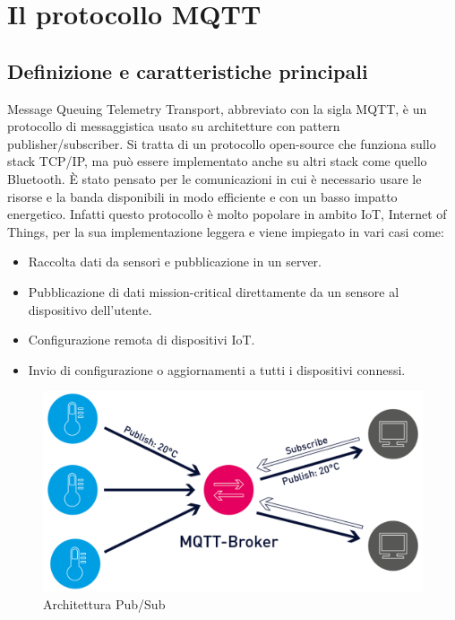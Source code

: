 
\chapter{Il protocollo MQTT}
\label{ch:mqtt}

\section{Definizione e caratteristiche principali}
\label{sec:mqtt-definizione}
Message Queuing Telemetry Transport, abbreviato con la sigla MQTT, è un protocollo di messaggistica usato su
architetture con pattern publisher/subscriber.
Si tratta di un protocollo open-source che funziona sullo stack TCP/IP, ma può essere implementato anche su altri
stack come quello Bluetooth.
È stato pensato per le comunicazioni in cui è necessario usare le risorse e la banda disponibili in modo efficiente
e con un basso impatto energetico.
Infatti questo protocollo è molto popolare in ambito IoT, Internet of Things, per la sua implementazione leggera e viene
impiegato in vari casi come:
\begin{itemize}
    \item Raccolta dati da sensori e pubblicazione in un server.
    \item Pubblicazione di dati mission-critical direttamente da un sensore al dispositivo dell'utente.
    \item Configurazione remota di dispositivi IoT.
    \item Invio di configurazione o aggiornamenti a tutti i dispositivi connessi.
\end{itemize}

\begin{figure}[htp]
    \centering
    \includegraphics[width=0.7\linewidth]{images/chapter1-mqtt-architecture}
    \caption{Architettura Pub/Sub}
\end{figure}

